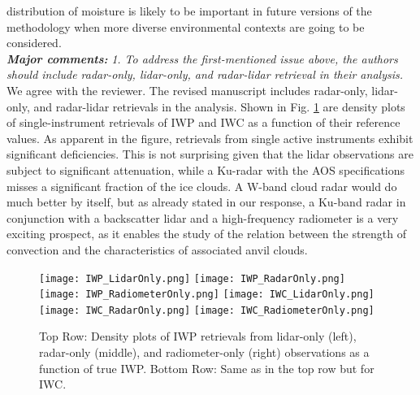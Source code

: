 \documentclass[12pt]{article}
\begin{document}
distribution of moisture is likely to be important in future versions of the methodology when more diverse environmental contexts are going to be considered.\\
\newline
\textit{\textbf{Major comments:}}
\textit{1. To address the first-mentioned issue above, the authors should include radar-only, lidar-only, and radar-lidar 
    retrieval in their analysis.}\\
\newline
We agree with the reviewer. The revised manuscript includes radar-only, lidar-only, and radar-lidar retrievals in the analysis.  Shown 
in Fig. \ref{fig:IWP_IWC} are density plots of single-instrument retrievals of IWP and IWC as a function of their reference values.
As apparent in the figure, retrievals from single active instruments exhibit significant deficiencies.  This is not surprising given that
the lidar observations are subject to significant attenuation, while a Ku-radar with the AOS specifications misses a significant fraction of
the ice clouds. A W-band cloud radar would do much better by itself, but as already stated in our response, a Ku-band radar in conjunction
with a backscatter lidar and a high-frequency radiometer is a very exciting prospect, as it enables the study of the relation between 
the strength of convection and the characteristics of associated anvil clouds. \\
\begin{figure}
\centering
\texttt{[image: IWP\_LidarOnly.png]}
\texttt{[image: IWP\_RadarOnly.png]}
\texttt{[image: IWP\_RadiometerOnly.png]}
\texttt{[image: IWC\_LidarOnly.png]}
\texttt{[image: IWC\_RadarOnly.png]}
\texttt{[image: IWC\_RadiometerOnly.png]}
\caption{Top Row: Density plots of IWP retrievals from lidar-only (left), radar-only (middle), and radiometer-only (right) observations as a function
of true IWP. Bottom Row: Same as in the top row but for IWC.}
\label{fig:IWP_IWC}
\end{figure}
    
\end{document}
